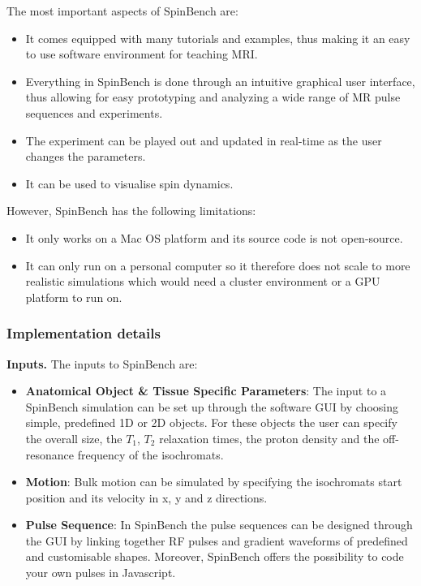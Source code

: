 The most important aspects of SpinBench are:
\begin{itemize}

    \item It comes equipped with many tutorials and examples, thus making it an easy to use software environment for teaching MRI.
    
    \item Everything in SpinBench is done through an intuitive graphical user interface, thus allowing for easy prototyping and analyzing a wide range of MR pulse sequences and experiments.
    
    \item The experiment can be played out and updated in real-time as the user changes the parameters.
    
    \item It can be used to visualise spin dynamics.
    
\end{itemize}

\hfill

However, SpinBench has the following limitations:
\begin{itemize}
    
    \item It only works on a Mac OS platform and its source code is not open-source.
    
    \item It can only run on a personal computer so it therefore does not scale to more realistic simulations which would need a cluster environment or a GPU platform to run on.
    
\end{itemize}

\hfill

\subsubsection{Implementation details}

\textbf{Inputs.} The inputs to SpinBench are:

\begin{itemize}
    
    \item \textbf{Anatomical Object \& Tissue Specific Parameters}: The input to a SpinBench simulation can be set up through the software GUI by choosing simple, predefined 1D or 2D objects. 
    For these objects the user can specify the overall size, the $T_1$, $T_2$ relaxation times, the proton density and the off-resonance frequency of the isochromats.
    
    \item \textbf{Motion}: Bulk motion can be simulated by specifying the isochromats start position and its velocity in x, y and z directions.
    
    \item \textbf{Pulse Sequence}: In SpinBench the pulse sequences can be designed through the GUI by linking together RF pulses and gradient waveforms of predefined and customisable shapes.
    Moreover, SpinBench offers the possibility to code your own pulses in Javascript.
    
\end{itemize}

